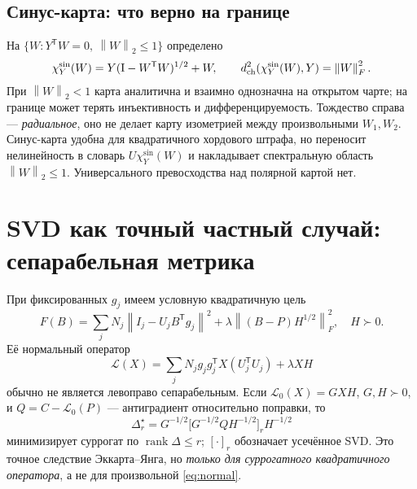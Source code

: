 \documentclass[10.5pt,a4paper]{article}
\newcommand{\I}{\mathrm{I}}
\newcommand{\T}{^{\mathsf T}}
\newcommand{\norm}[1]{\left\|#1\right\|}
\DeclareMathOperator{\rank}{rank}
\numberwithin{equation}{section}
\theoremstyle{plain}
\theoremstyle{definition}
\begin{document}
\subsection{Синус-карта: что верно на границе}
На $\{W:Y\T W=0,\ \norm{W}_2\le1\}$ определено
\begin{equation}
 \chi^{\sin}_Y(W)=Y(\I-W\T W)^{1/2}+W,\qquad
 d_{\rm ch}^2(\chi_Y^{\sin}(W),Y)=\norm{W}_F^2.
 \label{eq:sine}
\end{equation}
При $\norm{W}_2<1$ карта аналитична и взаимно однозначна на открытом чарте; на границе может терять инъективность и дифференцируемость. Тождество справа --- \emph{радиальное}, оно не делает карту изометрией между произвольными $W_1,W_2$. Синус-карта удобна для квадратичного хордового штрафа, но переносит нелинейность в словарь $U\chi_Y^{\sin}(W)$ и накладывает спектральную область $\norm{W}_2\le1$. Универсального превосходства над полярной картой нет.

\section{SVD как точный частный случай: сепарабельная метрика}
При фиксированных $g_j$ имеем условную квадратичную цель
\begin{equation}
 F(B)=\sum_jN_j\norm{I_j-U_jB\T g_j}^2
 +\lambda\norm{(B-P)H^{1/2}}_F^2,\quad H\succ0.
 \label{eq:fixed}
\end{equation}
Её нормальный оператор
\begin{equation}
 \mathcal L(X)=\sum_jN_jg_jg_j\T X(U_j\T U_j)+\lambda XH
 \label{eq:normal}
\end{equation}
обычно не является левоправо сепарабельным. Если $\mathcal L_0(X)=GXH$, $G,H\succ0$, и $Q=C-\mathcal L_0(P)$ --- антиградиент относительно поправки, то
\begin{equation}
 \Delta_r^\star=G^{-1/2}\bigl[G^{-1/2}QH^{-1/2}\bigr]_r H^{-1/2}
 \label{eq:svd}
\end{equation}
минимизирует суррогат по $\rank\Delta\le r$; $[\cdot]_r$ обозначает усечённое SVD. Это точное следствие Эккарта--Янга, но \emph{только для суррогатного квадратичного оператора}, а не для произвольной \eqref{eq:normal}.
\end{document}
